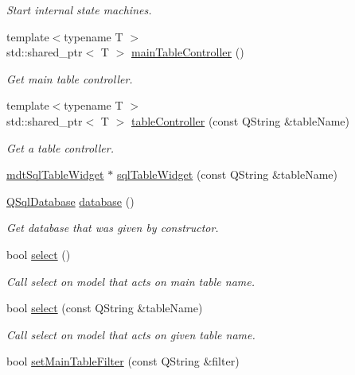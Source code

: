 \begin{DoxyCompactItemize}
\begin{DoxyCompactList}\small\item\em Start internal state machines. \end{DoxyCompactList}\item 
{\footnotesize template$<$typename T $>$ }\\std\-::shared\-\_\-ptr$<$ T $>$ \hyperlink{classmdt_sql_form_ac32b24ebb2d203cbefb6c7bdb8d9867b}{main\-Table\-Controller} ()
\begin{DoxyCompactList}\small\item\em Get main table controller. \end{DoxyCompactList}\item 
{\footnotesize template$<$typename T $>$ }\\std\-::shared\-\_\-ptr$<$ T $>$ \hyperlink{classmdt_sql_form_ae812518bc0c786b918dbc63bc8a69741}{table\-Controller} (const Q\-String \&table\-Name)
\begin{DoxyCompactList}\small\item\em Get a table controller. \end{DoxyCompactList}\item 
\hyperlink{classmdt_sql_table_widget}{mdt\-Sql\-Table\-Widget} $\ast$ \hyperlink{classmdt_sql_form_a6a17f32077fb7cc33139c3dc26a8d011}{sql\-Table\-Widget} (const Q\-String \&table\-Name)
\item 
\hyperlink{class_q_sql_database}{Q\-Sql\-Database} \hyperlink{classmdt_sql_form_ac8423f91a1f8a6fa7408cd61be86a89c}{database} ()
\begin{DoxyCompactList}\small\item\em Get database that was given by constructor. \end{DoxyCompactList}\item 
bool \hyperlink{classmdt_sql_form_a2a2f564fe934cc8997b07f90abb771e1}{select} ()
\begin{DoxyCompactList}\small\item\em Call select on model that acts on main table name. \end{DoxyCompactList}\item 
bool \hyperlink{classmdt_sql_form_ae9a1f8c03e5ac8ccd01fa804356abd01}{select} (const Q\-String \&table\-Name)
\begin{DoxyCompactList}\small\item\em Call select on model that acts on given table name. \end{DoxyCompactList}\item 
bool \hyperlink{classmdt_sql_form_a86c870d9875efbd83262f5dd28df5177}{set\-Main\-Table\-Filter} (const Q\-String \&filter)

\end{DoxyCompactItemize}
